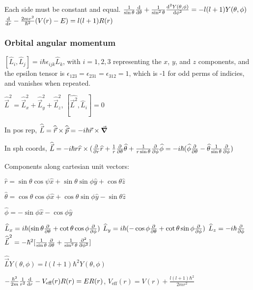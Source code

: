 Each side must be constant and equal.
$\frac{1}{\sin\theta} \dv{}{\theta} (\sin \theta \dv{Y(\theta, \phi)}{\theta}) + \frac{1}{\sin^2 \theta} \dv[2]{Y(\theta, \phi)}{\phi} = -l(l+1)Y(\theta, \phi)$
$\dv{}{r}(r^2 \dv{R(r)}{r}) - \frac{2mr^2}{\hbar^2}(V(r) - E) = l(l+1) R(r)$

\subsubsection{Orbital angular momentum}

$[\widehat{L}_i, \widehat{L}_j] = i \hbar \epsilon_{ijk} \widehat{L}_k$, with $i =1, 2, 3$ representing the $x$, $y$, and $z$ components, and the epsilon tensor is $\epsilon_{123} = \epsilon_{231} = \epsilon_{312} = 1$, which is -1 for odd perms of indicies, and vanishes when repeated.

$\widehat{\vec{L}}^2 = \widehat{\vec{L}}_x^2 + \widehat{\vec{L}}_y^2 + \widehat{\vec{L}}_z^2$, $[\widehat{\vec{L}^2}, \widehat{L}_i]=0$

In pos rep, $\widehat{\vec{L}} = \widehat{\vec{r}} \times \widehat{\vec{p}} = -i \hbar \vec{r} \times \vec{\grad}$

In sph coords, $\widehat{\vec{L}} = -i \hbar r \widehat{r} \times (\pdv{}{r} \widehat{r} + \frac{1}{r} \pdv{}{\theta} \widehat{\theta} + \frac{1}{r \sin\theta} \pdv{}{\phi} \widehat{\phi} = -i \hbar (\widehat{\phi} \pdv{}{\theta} - \widehat{\theta} \frac{1}{\sin \theta} \pdv{}{\phi})$

Components along cartesian unit vectors:

$\widehat{r} = \sin \theta \cos \psi \widehat{x} + \sin \theta \sin \phi \widehat{y} + \cos \theta \widehat{z}$

$\widehat{\theta} = \cos{\theta} \cos{\phi} \widehat{x} + \cos{\theta} \sin{\phi} \widehat{y} - \sin{\theta} \widehat{z}$

$\widehat{\phi} = - \sin \phi \widehat{x} - \cos \phi \widehat{y}$

$\widehat{L}_x = i \hbar (\sin \theta \pdv{}{\theta} + \cot \theta \cos \phi \pdv{}{\phi})$
$\widehat{L}_y = i \hbar(-\cos \phi \pdv{}{\theta} + \cot \theta \sin \phi \pdv{}{\phi})$
$\widehat{L}_z = -i \hbar \pdv{}{\phi}$
$\widehat{\vec{L}}^2 = -\hbar^2 [\frac{1}{\sin \theta} \pdv{}{\theta} (\sin \theta \pdv{}{\theta}) + \frac{1}{\sin^2 \theta} \pdv[2]{}{\phi}]$

$\widehat{\vec{L}} Y(\theta, \phi) = l (l+1) \hbar^2 Y(\theta, \phi)$

$-\frac{\hbar^2}{2m} \frac{1}{r^2} \dv{}{r} (r^2 \dv{R(r)}{r}) - V_{\textrm{eff}}(r) R(r) = ER(r)$, $V_{\textrm{eff}}(r) = V(r) + \frac{l(l+1) \hbar^2}{2mr^2}$

